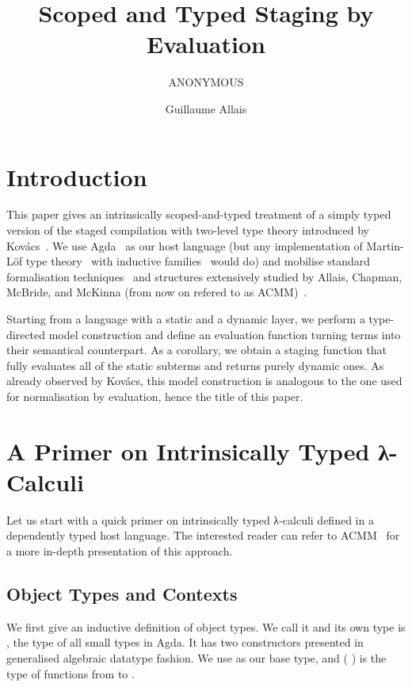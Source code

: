 \documentclass{article}
\title{Scoped and Typed Staging by Evaluation}
\author{ANONYMOUS}
\author{Guillaume Allais}
\begin{document}
\maketitle

\section{Introduction}

This paper gives an intrinsically scoped-and-typed
treatment of a simply typed version of the staged compilation
with two-level type theory introduced by
Kov{\'{a}}cs~\cite{DBLP:journals/pacmpl/Kovacs22}.
%
We use Agda~\cite{DBLP:conf/afp/Norell08}
as our host language (but any implementation
of Martin-Löf type theory~\cite{DBLP:books/daglib/0000395}
with inductive families~\cite{DBLP:journals/fac/Dybjer94}
would do)
and mobilise standard formalisation
techniques~\cite{DBLP:journals/lisp/Coquand02, DBLP:journals/jar/BentonHKM12}
and structures extensively studied by Allais, Chapman,
McBride, and McKinna (from now on refered to as ACMM)~\cite{DBLP:conf/cpp/Allais0MM17}.

Starting from a language with a static and a dynamic layer,
we perform a type-directed model construction
and define an evaluation function turning terms
into their semantical counterpart.
%
As a corollary, we obtain a staging function that
fully evaluates all of the static subterms and returns
purely dynamic ones.
%
As already observed by Kov{\'{a}}cs, this model construction
is analogous to the one used for normalisation by evaluation,
hence the title of this paper.


\section{A Primer on Intrinsically Typed λ-Calculi}\label{sec:intrinsictyping}

Let us start with a quick primer on intrinsically typed λ-calculi
defined in a dependently typed host language. The interested reader
can refer to ACMM~\cite{DBLP:conf/cpp/Allais0MM17} for a more in-depth
presentation of this approach.

\subsection{Object Types and Contexts}

We first give an inductive definition of object types.
We call it  and its own type is ,
the type of all small types in Agda.
It has two constructors presented in generalised algebraic
datatype fashion.
We use  as our base type,
and (  ) is the type of functions from
 to .
\end{document}
